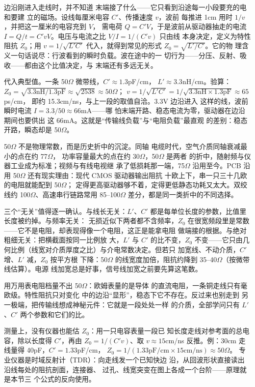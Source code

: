 边沿刚进入走线时，并不知道
末端接了什么——它只看到沿途每一小段要充的电和要建
立的磁场。设线每厘米电容 $C'$、传播速度 $v$，波前
每推进 1cm 用时 $1/v$，并把这一厘米的电容充到 $V$，
需电荷 $Q=C'V$，于是波前从驱动器抽走的电流
$I=Q/t=C'vV$。电压与电流之比 $V/I=1/(C'v)$ 只由线
本身决定，定义为特性阻抗 $Z_0$；用 $v=1/\sqrt{L'C'}$
代入，就得到常见的形式 $Z_0=\sqrt{L'/C'}$。它的物
理含义一句话说尽：行波看到的瞬时负载。波在途中的一
切行为——分压、反射、吸收——都由这个比值决定，与
末端还有多远无关。

代入典型值。一条 50$\Omega$ 微带线，$C'\approx1.3$pF/cm，
$L'\approx3.3$nH/cm。验算：
$Z_0=\sqrt{3.3\text{nH}/1.3\text{pF}}\approx\sqrt{2538}\approx50\Omega$；
$v=1/\sqrt{L'C'}=1/\sqrt{3.3\text{nH}\times1.3\text{pF}}\approx65$ps/cm，
即约 15.3cm/ns，与上一段的取值自洽。3.3V 边沿进入
这样的线，波前瞬时电流 $I=3.3/50\approx66$mA——哪
怕末端开路、稳态电流为零，驱动器在边沿期间也要供出
这 66mA。这就是“传输线负载”与“电阻负载”最直观
的差别：稳态开路，瞬态却是 50$\Omega$。

50$\Omega$ 不是物理常数，而是历史折中的沉淀。同轴
电缆时代，空气介质同轴衰减最小的点在约 77$\Omega$，
功率容量最大的点在约 30$\Omega$，50$\Omega$ 是两者
的折中，随射频与仪器工业成为标准；视频与有线电视继
承了低损耗那一端，75$\Omega$ 沿用至今。PCB 沿用
50$\Omega$ 还有现实理由：现代 CMOS 驱动器输出阻抗
十欧上下，串一只三十几欧的电阻就能配到 50$\Omega$；
定得更高驱动器够不着，定得更低静态功耗又太大。双绞
线约 100$\Omega$、高速串行链路常用 85--100$\Omega$
差分，都是同一类折中的不同选择。

三个“无关”值得逐一确认。与线长无关：$L'$、$C'$
都是每单位长度的参数，比值里长度被约掉。与频率无关：
无损近似下两者都不含频率，$Z_0$ 在很宽频段里是常数
——它不是电阻，却表现得像一个电阻，这正是能拿电阻
做端接的根据。与绝对粗细无关：把横截面按同一比例放
大，$L'$ 与 $C'$ 的比不变，$Z_0$ 不变——它只由几
何比例（线宽对介质厚度之比）与介电常数决定。但若只
加宽线、不动介质，$C'$ 增、$L'$ 减，$Z_0$ 按平方根
下降：50$\Omega$ 的线宽度加倍，阻抗约降到 35--40$\Omega$（按微带线估算）。电源
线加宽总是好事，信号线加宽之前要先算这笔数。

\begin{warningbox}
用万用表电阻档量不出 50$\Omega$：欧姆表量的是导体
的直流电阻，一条铜走线只有毫欧级。特性阻抗只对变化
中的边沿“显形”，稳态下它不存在。反过来也别走到
另一极端，把传输线想成神秘元件：它就是一段处处一样
的介质，全部学问只有 $L'$、$C'$ 两个参数和它们的比。
\end{warningbox}

测量上，没有仪器也能估 $Z_0$：用一只电容表量一段已
知长度走线对参考面的总电容，除以长度得 $C'$，再由
$Z_0=1/(C'v)$、取 $v\approx15$cm/ns 反推。例：30cm
走线量得 40pF，$C'=1.33$pF/cm，
$Z_0=1/(1.33\text{pF/cm}\times15\text{cm/ns})\approx50\Omega$。
专业仪器是时域反射计（TDR）：向走线发一个已知快边
沿，从回波形状直接读出沿线每处的阻抗剖面，连接器、
过孔、线宽突变在图上各成一个台阶——原理就是本节三
个公式的反向使用。

